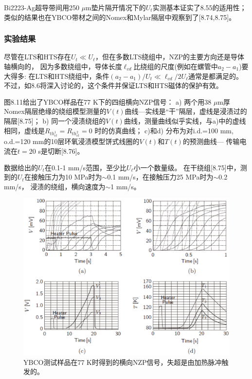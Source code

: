 Bi2223-Ag超导带间用250 $\mu$m垫片隔开情况下的$U_t$实测基本证实了8.55的适用性；
类似的结果也在YBCO带材之间的Nomex和Mylar隔层中观察到了[8.74,8.75]。

\subsubsection*{实验结果}
尽管在LTS和HTS存在$U_t\ll U_\ell$，但在多数LTS绕组中，NZP的主要方向还是导体轴横向的，
因为多数绕组中，导体长度$\ell_{cd}$比绕组的尺度(例如在螺管中$a_2-a_1$)要大得多:
在LTS和HTS绕组中，条件$(a_2-a_1)/U_t\ll \ell_{cd}/2U_\ell$通常是都满足的。
不过，如8.6将深入讨论的，这个条件并保证LTS和HTS磁体的保护有效。

图8.11给出了YBCO样品在77 K下的四组横向NZP信号：
a) 两个用38 $\mu$m厚Nomex隔层绝缘的绕组模型测量的$V(t)$曲线---实线是“干”隔层，虚线是浸渍过的隔层[8.75]；
b) 同一个浸渍绕组的$V(t)$曲线，测量曲线似乎实线，与a)中的虚线相同，虚线是$R_{th_{ct}^{1}}=R_{th_{ct}^{2}}=0$
时的仿真曲线；
c)和d) 分布为对i.d.=100 mm, o.d.=120 mm的10层环氧浸渍模型饼式线圈的$V(t)$和$T(t)$的预测曲线---
传输电流在$t=20$ s是切断[8.76]。

数据给出的$U_t$在0.1-1 mm/s范围，至少比$U_\ell$小一个数量级。
在干绕组[8.75]中，测到的$U_t$在接触压力为10 MPa时为$\sim$0.1 mm/s，在接触压力25 MPa时为$\sim$0.2 mm/s，
浸渍的绕组，横向速度为$\sim$1 mm/s。
\begin{figure}
	\centering
	\includegraphics[scale=0.5]{chpt8/figs/fig8.11.eps}
	\caption{YBCO测试样品在77 K时得到的横向NZP信号，失超是由加热脉冲触发的。}
\end{figure}



